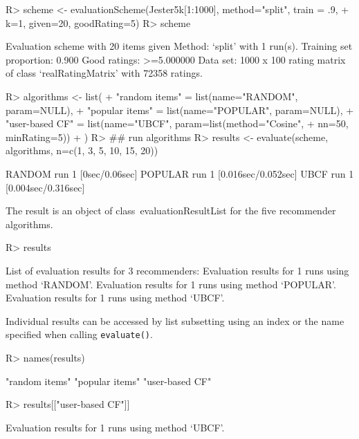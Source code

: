 \documentclass[nojss]{jss}
\newcommand{\class}[1]{\mbox{\textsf{#1}}}
\newcommand{\func}[1]{\mbox{\texttt{#1()}}}
\begin{document}
\begin{Schunk}
\begin{Sinput}
R> scheme <- evaluationScheme(Jester5k[1:1000], method="split", train = .9,
+     k=1, given=20, goodRating=5)
R> scheme
\end{Sinput}
\begin{Soutput}
Evaluation scheme with 20 items given
Method: ‘split’ with 1 run(s).
Training set proportion: 0.900
Good ratings: >=5.000000
Data set: 1000 x 100 rating matrix of class ‘realRatingMatrix’ with 72358 ratings.
\end{Soutput}
\begin{Sinput}
R> algorithms <- list(
+         "random items" = list(name="RANDOM", param=NULL),
+         "popular items" = list(name="POPULAR", param=NULL),
+         "user-based CF" = list(name="UBCF", param=list(method="Cosine",
+ 		nn=50, minRating=5))
+         )
R> ## run algorithms
R> results <- evaluate(scheme, algorithms, n=c(1, 3, 5, 10, 15, 20))
\end{Sinput}
\begin{Soutput}
RANDOM run
	 1  [0sec/0.06sec]
POPULAR run
	 1  [0.016sec/0.052sec]
UBCF run
	 1  [0.004sec/0.316sec]
\end{Soutput}
\end{Schunk}

The result is an object of class~\class{evaluationResultList} for the
five recommender algorithms.
\begin{Schunk}
\begin{Sinput}
R> results
\end{Sinput}
\begin{Soutput}
List of evaluation results for 3 recommenders:
Evaluation results for 1 runs using method ‘RANDOM’.
Evaluation results for 1 runs using method ‘POPULAR’.
Evaluation results for 1 runs using method ‘UBCF’.
\end{Soutput}
\end{Schunk}

Individual results can be accessed by list subsetting using an index or
the name specified when calling \func{evaluate}.

\begin{Schunk}
\begin{Sinput}
R> names(results)
\end{Sinput}
\begin{Soutput}
[1] "random items"  "popular items" "user-based CF"
\end{Soutput}
\begin{Sinput}
R> results[["user-based CF"]]
\end{Sinput}
\begin{Soutput}
Evaluation results for 1 runs using method ‘UBCF’.
\end{Soutput}
\end{Schunk}
\end{document}
